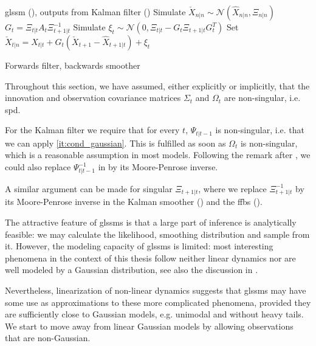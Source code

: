 \begin{algorithm}
    \begin{algorithmic}[1]
        \Require \acrshort{glssm} (), outputs from Kalman filter ()
        \State Simulate $\check X_{n|n} \sim \mathcal N(\hat X_{n|n}, \Xi_{n|n})$
            \State $G_{t} = \Xi_{t|t}A_{t}\Xi^{-1}_{t + 1 | t}$
            \State Simulate $\xi_{t} \sim \mathcal N(0, \Xi_{t|t} - G_{t}\Xi_{t+1|t}G^{T}_t)$
            \State Set $\check X_{t|n} = \hat X_{t|t} + G_{t} \left( \check X_{t + 1} - \hat X_{t + 1| t} \right) + \xi_{t}$
        \EndFor
    \end{algorithmic}
    \caption{Forwards filter, backwards smoother \citep[Proposition 1]{Fruhwirth-Schnatter1994Data}} \label{alg:ffbs}
\end{algorithm}

\begin{remark}
    \label{rem:regular_covs}
    Throughout this section, we have assumed, either explicitly or implicitly, that the innovation and observation covariance matrices $\Sigma_{t}$ and $\Omega_{t}$ are non-singular, i.e. \acrshort{spd}.

    For the Kalman filter we require that for every $t$, $\Psi_{t|t-1}$ is non-singular, i.e. that we can apply  \ref{it:cond_gaussian}. This is fulfilled as soon as $\Omega_{t}$ is non-singular, which is a reasonable assumption in most models. Following the remark after , we could also replace $\Psi_{t|t-1}^{-1}$ in  by its Moore-Penrose inverse. 

    A similar argument can be made for singular $\Xi_{t+1|t}$, where we replace $\Xi_{t+1|t}^{-1}$ by its Moore-Penrose inverse in the Kalman smoother () and the \acrshort{ffbs} (). 
\end{remark}


The attractive feature of \glspl{glssm} is that a large part of inference is analytically feasible: we may calculate the likelihood, smoothing distribution and sample from it. 
However, the modeling capacity of \glspl{glssm} is limited: most interesting phenomena in the context of this thesis follow neither linear dynamics nor are well modeled by a Gaussian distribution, see also the discussion in .

Nevertheless, linearization of non-linear dynamics suggests that \gls{glssm}s may have some use as approximations to these more complicated phenomena, provided they are sufficiently close to Gaussian models, e.g. unimodal and without heavy tails.
We start to move away from linear Gaussian models by allowing observations that are non-Gaussian.